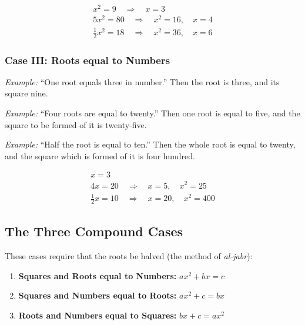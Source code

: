 \documentclass[11pt,a4paper,openany,oneside]{book}
\begin{document}
\begin{equation}
\begin{gathered}
\boxed{x^2 = 9 \quad\Rightarrow\quad x = 3}\\[0.35em]
\boxed{5x^2 = 80 \quad\Rightarrow\quad x^2 = 16,\quad x = 4}\\[0.35em]
\boxed{\tfrac{1}{2}x^2 = 18 \quad\Rightarrow\quad x^2 = 36,\quad x = 6}
\end{gathered}
\end{equation}

\subsubsection*{Case III: Roots equal to Numbers}

\textit{Example:} ``One root equals three in number.'' Then the root is three,
and its square nine.

\textit{Example:} ``Four roots are equal to twenty.'' Then one root is equal to
five, and the square to be formed of it is twenty-five.

\textit{Example:} ``Half the root is equal to ten.'' Then the whole root is equal
to twenty, and the square which is formed of it is four hundred.

\begin{equation}
\begin{gathered}
\boxed{x = 3}\\[0.35em]
\boxed{4x = 20 \quad\Rightarrow\quad x = 5,\quad x^2 = 25}\\[0.35em]
\boxed{\tfrac{1}{2}x = 10 \quad\Rightarrow\quad x = 20,\quad x^2 = 400}
\end{gathered}
\end{equation}

\subsection{The Three Compound Cases}

These cases require that the roots be halved (the method of \textit{al-jabr}):

\begin{mathbox}[title={\textbf{Compound Cases (require halving the roots)}}]
\begin{enumerate}[label=\textbf{Case \Roman*:},leftmargin=3em]
  \item[(IV)] \textbf{Squares and Roots equal to Numbers:}
  $ax^2 + bx = c$
  
  \item[(V)] \textbf{Squares and Numbers equal to Roots:}
  $ax^2 + c = bx$
  
  \item[(VI)] \textbf{Roots and Numbers equal to Squares:}
  $bx + c = ax^2$
\end{enumerate}
\end{mathbox}
\end{document}
